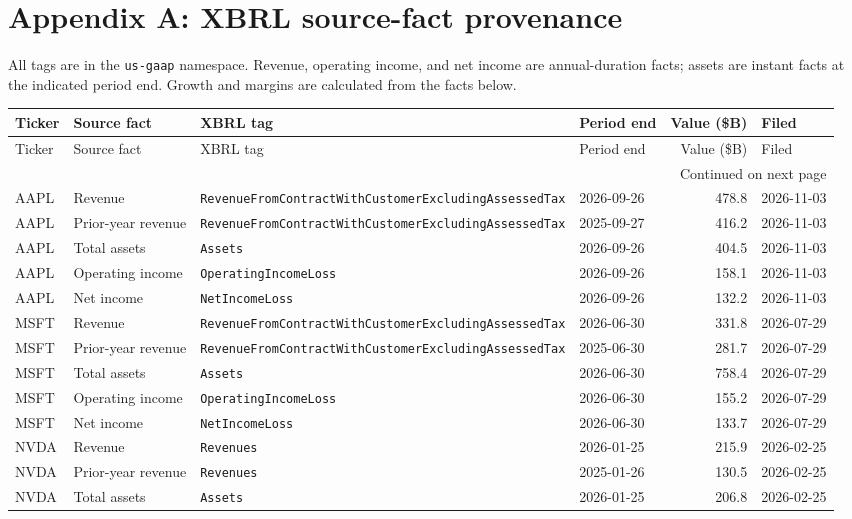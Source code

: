 \documentclass[11pt]{article}
\newcommand{\RevenueTag}{\texttt{RevenueFromContractWith\allowbreak CustomerExcluding\allowbreak AssessedTax}}
\begin{document}
\clearpage
\section*{Appendix A: XBRL source-fact provenance}

All tags are in the \texttt{us-gaap} namespace. Revenue, operating income, and net income are annual-duration facts; assets are instant facts at the indicated period end. Growth and margins are calculated from the facts below.

\footnotesize
\begin{longtable}{@{}l>{\raggedright\arraybackslash}p{2.55cm}>{\raggedright\arraybackslash}p{5.65cm}lrl@{}}
\toprule
Ticker & Source fact & XBRL tag & Period end & Value (\$B) & Filed \\
\midrule
\endfirsthead
\toprule
Ticker & Source fact & XBRL tag & Period end & Value (\$B) & Filed \\
\midrule
\endhead
\midrule
\multicolumn{6}{r}{Continued on next page} \\
\endfoot
\bottomrule
\endlastfoot
AAPL & Revenue & \RevenueTag & 2026-09-26 & 478.8 & 2026-11-03 \\
AAPL & Prior-year revenue & \RevenueTag & 2025-09-27 & 416.2 & 2026-11-03 \\
AAPL & Total assets & \texttt{Assets} & 2026-09-26 & 404.5 & 2026-11-03 \\
AAPL & Operating income & \texttt{OperatingIncomeLoss} & 2026-09-26 & 158.1 & 2026-11-03 \\
AAPL & Net income & \texttt{NetIncomeLoss} & 2026-09-26 & 132.2 & 2026-11-03 \\
\addlinespace[3pt]
MSFT & Revenue & \RevenueTag & 2026-06-30 & 331.8 & 2026-07-29 \\
MSFT & Prior-year revenue & \RevenueTag & 2025-06-30 & 281.7 & 2026-07-29 \\
MSFT & Total assets & \texttt{Assets} & 2026-06-30 & 758.4 & 2026-07-29 \\
MSFT & Operating income & \texttt{OperatingIncomeLoss} & 2026-06-30 & 155.2 & 2026-07-29 \\
MSFT & Net income & \texttt{NetIncomeLoss} & 2026-06-30 & 133.7 & 2026-07-29 \\
\addlinespace[3pt]
NVDA & Revenue & \texttt{Revenues} & 2026-01-25 & 215.9 & 2026-02-25 \\
NVDA & Prior-year revenue & \texttt{Revenues} & 2025-01-26 & 130.5 & 2026-02-25 \\
NVDA & Total assets & \texttt{Assets} & 2026-01-25 & 206.8 & 2026-02-25 \\

\end{longtable}
\end{document}
